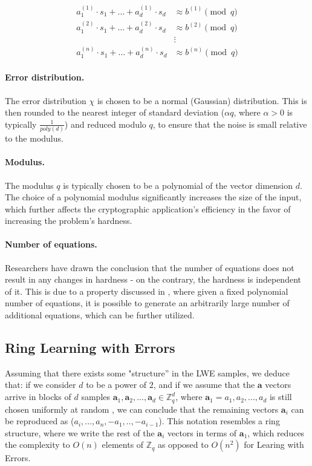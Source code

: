 \documentclass[11pt,
  titlepage=false,
  abstract=on,
]{scrreprt}
\begin{document}
\[
  \begin{aligned}
a_1^{(1)} \cdot s_1 + \dots + a_d^{(1)} \cdot s_d &\approx b^{(1)} \pmod{q} \\
a_1^{(2)} \cdot s_1 + \dots + a_d^{(2)} \cdot s_d &\approx b^{(2)} \pmod{q} \\
&\vdots \\
a_1^{(n)} \cdot s_1 + \dots + a_d^{(n)} \cdot s_d &\approx b^{(n)} \pmod{q}
\label{THeLearning with Errors Problem}
\end{aligned}
\]

\paragraph{Error distribution.}
The error distribution $\chi$ is chosen to be a normal (Gaussian) distribution. This is then rounded to the nearest integer of standard deviation ($\alpha q$, where $\alpha > 0$ is typically $\frac{1}{poly(d)}$)
and reduced modulo $q$, to ensure that the noise is small relative to the modulus.

\paragraph{Modulus.} The modulus $q$ is typically chosen to be a polynomial of the vector dimension $d$. The choice of a polynomial modulus significantly increases the size of the input, which further affects
the cryptographic application's efficiency in the favor of increasing the problem's hardness.

\paragraph{Number of equations.} Researchers have drawn the conclusion that the number of equations does not result in any changes in hardness - on the contrary, the hardness is independent of it.
This is due to a property discussed in \cite{regev2010learning}, where given a fixed polynomial number of equations,  it is possible to generate an arbitrarily large number of additional equations, 
which can be further utilized.



\subsection{Ring Learning with Errors \cite{regev2010learning}} 
Assuming that there exists some "structure'' in the LWE samples, we deduce that: if we consider $d$ to be a power of $2$, and if we assume that the $\mathbf{a}$ vectors arrive in blocks of $d$ samples
$\mathbf{a}_1, \mathbf{a}_2,..., \mathbf{a}_d \in \mathbb{Z}^d_q$, where $\mathbf{a}_1 = a_1, a_2,..., a_d$ is still chosen uniformly at random , we can conclude that the remaining vectors $\mathbf{a}_i$
can be reproduced as ($a_i,..., a_n, -a_1,..,-a_{i-1}$). This notation resembles a ring structure, where we write the rest of the $\mathbf{a}_i$ vectors in terms of $\mathbf{a}_1$, which reduces the 
complexity to $O(n)$ elements of $\mathbb{Z}_q$ as opposed to $O(n^2)$ for Learing with Errors.
\end{document}
